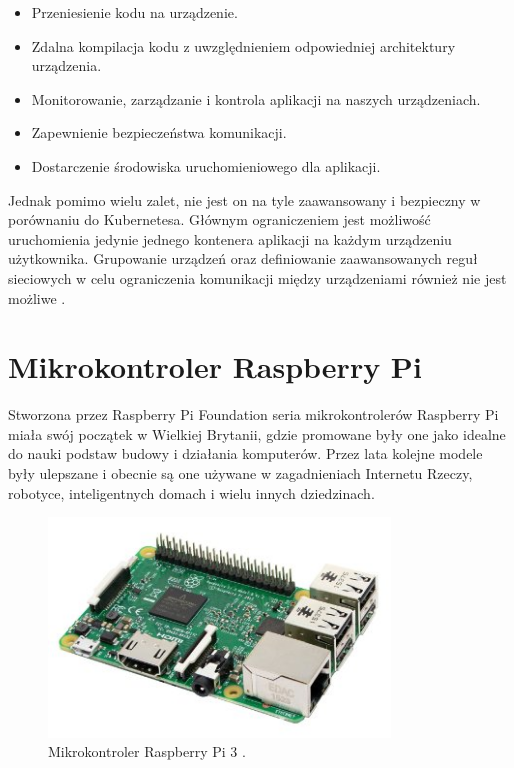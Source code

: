 \documentclass[12pt]{report}
\let\Oldsection\section
\renewcommand{\section}{\FloatBarrier\Oldsection}
\begin{document}
{\begin{itemize}
\item{Przeniesienie kodu na urządzenie.}
\item{Zdalna kompilacja kodu z uwzględnieniem odpowiedniej architektury urządzenia.}
\item{Monitorowanie, zarządzanie i kontrola aplikacji na naszych urządzeniach.}
\item{Zapewnienie bezpieczeństwa komunikacji.}
\item{Dostarczenie środowiska uruchomieniowego dla aplikacji.}
\end{itemize}

Jednak pomimo wielu zalet, nie jest on na tyle zaawansowany i bezpieczny w porównaniu do Kubernetesa. Głównym ograniczeniem jest możliwość uruchomienia jedynie jednego kontenera aplikacji na każdym urządzeniu użytkownika. Grupowanie urządzeń oraz definiowanie zaawansowanych reguł sieciowych w celu ograniczenia komunikacji między urządzeniami również nie jest możliwe \cite{resin}.

\section{Mikrokontroler Raspberry Pi}
Stworzona przez Raspberry Pi Foundation seria mikrokontrolerów Raspberry Pi miała swój początek w Wielkiej Brytanii, gdzie promowane były one jako idealne do nauki podstaw budowy i działania komputerów. Przez lata kolejne modele były ulepszane i obecnie są one używane w zagadnieniach Internetu Rzeczy, robotyce, inteligentnych domach i wielu innych dziedzinach.

\begin{figure}[h]
	\centering
	\includegraphics[width=0.81\textwidth]{images/rpi3.jpg}
	\caption{Mikrokontroler Raspberry Pi 3 \cite{rpi3Img}.}
\end{figure}

}
\end{document}

